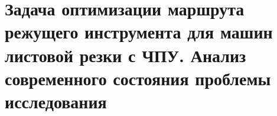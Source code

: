 
\chapter{
  Задача оптимизации маршрута
  режущего инструмента
  для машин листовой резки с ЧПУ.
  Анализ современного состояния
  проблемы исследования
}
\label{ch:review}








